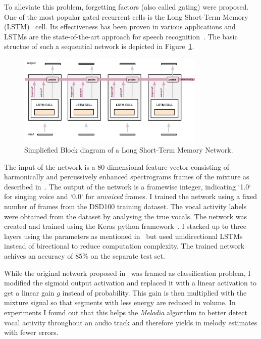 To alleviate this problem, forgetting factors (also called gating) were proposed.
One of the most popular gated recurrent cells is the Long Short-Term Memory (LSTM)~\cite{Hochreiter97} cell.
Its effectiveness has been proven in various applications and LSTMs are the state-of-the-art approach for speech recognition~\cite{Graves13}.
The basic structue of such a sequential network is depicted in Figure~\ref{fig:lstm_2}.
\begin{figure}
  \centering
  \includegraphics[width=0.8\textwidth]{Chapters/05_Separation_Known/figures/lstm_2.pdf}
  \caption{Simpliefied Block diagram of a Long Short-Term Memory Network.}
  \label{fig:lstm_2}
\end{figure}
The input of the network is a 80 dimensional feature vector consisting of harmonically and percussively enhanced spectrograms frames of the mixture as described in~\cite{ono08}.
The output of the network is a framewise integer, indicating `1.0` for singing voice and `0.0` for \emph{unvoiced} frames.
I trained the network using a fixed number of frames from the DSD100 training dataset.
The vocal activity labels were obtained from the dataset by analysing the true vocals.
The network was created and trained using the Keras python framework~\cite{chollet17}.
I stacked up to three layers using the parameters as mentioned in~\cite{Leglaive15} but used unidirectional LSTMs instead of birectional to reduce computation complexity.
The trained network achives an accuracy of 85\% on the separate test set.\par
While the original network proposed in~\cite{leglaive15} was framed as  classification problem, I modified the sigmoid output activation and replaced it with a linear activation to get a linear gain \(g\) instead of probability.
This gain is then multiplied with the mixture signal so that segments with less energy are reduced in volume.
In experiments I found out that this helps the \emph{Melodia} algorithm to better detect vocal activity throughout an audio track and therefore yields in melody estimates with fewer errors.

